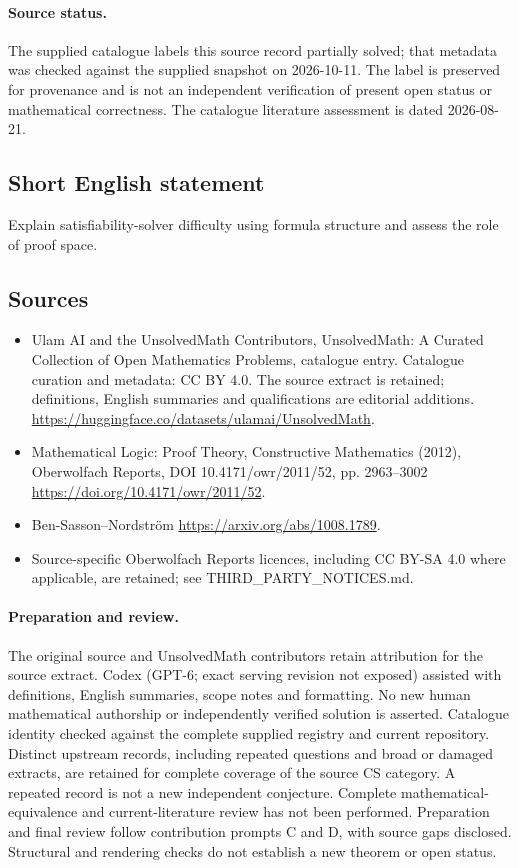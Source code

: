 \documentclass[11pt]{article}
\begin{document}
\paragraph{Source status.}
The supplied catalogue labels this source record partially solved; that metadata was checked against the supplied snapshot on 2026-10-11. The label is preserved for provenance and is not an independent verification of present open status or mathematical correctness. The catalogue literature assessment is dated 2026-08-21.
\subsection{Short English statement}
Explain satisfiability-solver difficulty using formula structure and assess the role of proof space.
\subsection{Sources}
\begin{itemize}
\item[S1] Ulam AI and the UnsolvedMath Contributors, UnsolvedMath: A Curated Collection of Open Mathematics Problems, catalogue entry. Catalogue curation and metadata: CC BY 4.0. The source extract is retained; definitions, English summaries and qualifications are editorial additions.
\url{https://huggingface.co/datasets/ulamai/UnsolvedMath}.
\item[S2] Mathematical Logic: Proof Theory, Constructive Mathematics (2012), Oberwolfach Reports, DOI 10.4171/owr/2011/52, pp. 2963--3002
\url{https://doi.org/10.4171/owr/2011/52}.
\item[S3] Ben-Sasson--Nordström
\url{https://arxiv.org/abs/1008.1789}.
\item Source-specific Oberwolfach Reports licences, including CC BY-SA 4.0 where applicable, are retained; see THIRD\_PARTY\_NOTICES.md.
\end{itemize}
\paragraph{Preparation and review.}
The original source and UnsolvedMath contributors retain attribution for the source extract. Codex (GPT-6; exact serving revision not exposed) assisted with definitions, English summaries, scope notes and formatting. No new human mathematical authorship or independently verified solution is asserted. Catalogue identity checked against the complete supplied registry and current repository. Distinct upstream records, including repeated questions and broad or damaged extracts, are retained for complete coverage of the source CS category. A repeated record is not a new independent conjecture. Complete mathematical-equivalence and current-literature review has not been performed. Preparation and final review follow contribution prompts C and D, with source gaps disclosed. Structural and rendering checks do not establish a new theorem or open status.
\label{end:statement}
\end{document}
